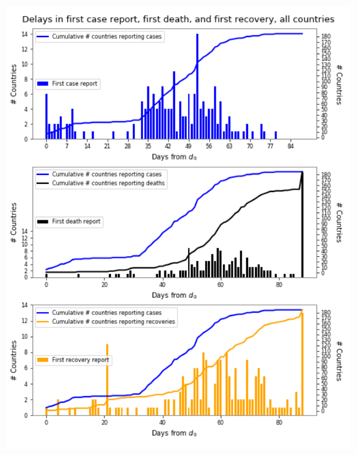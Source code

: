 %
\begin{figure}[h]
\begin{minipage}{0.5\textwidth}
\includegraphics[width=\textwidth]{figures/tsam_Covid19_JHU_reportArrivals_AllCountries}
\end{minipage}%
\begin{minipage}{0.5\textwidth}

\end{minipage}
\end{figure}
